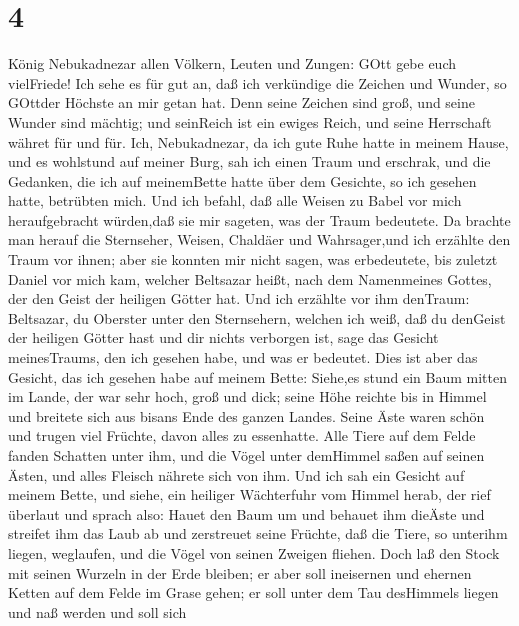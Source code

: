 \hypertarget{section-3}{%
\section{4}\label{section-3}}

 König Nebukadnezar allen Völkern, Leuten und Zungen: GOtt
gebe euch vielFriede!  Ich sehe es für gut an, daß ich
verkündige die Zeichen und Wunder, so GOttder Höchste an mir getan hat.
 Denn seine Zeichen sind groß, und seine Wunder sind
mächtig; und seinReich ist ein ewiges Reich, und seine Herrschaft währet
für und für.  Ich, Nebukadnezar, da ich gute Ruhe hatte in
meinem Hause, und es wohlstund auf meiner Burg,  sah ich
einen Traum und erschrak, und die Gedanken, die ich auf meinemBette
hatte über dem Gesichte, so ich gesehen hatte, betrübten mich.
 Und ich befahl, daß alle Weisen zu Babel vor mich
heraufgebracht würden,daß sie mir sageten, was der Traum bedeutete.
 Da brachte man herauf die Sternseher, Weisen, Chaldäer und
Wahrsager,und ich erzählte den Traum vor ihnen; aber sie konnten mir
nicht sagen, was erbedeutete,  bis zuletzt Daniel vor mich
kam, welcher Beltsazar heißt, nach dem Namenmeines Gottes, der den Geist
der heiligen Götter hat. Und ich erzählte vor ihm denTraum: 
Beltsazar, du Oberster unter den Sternsehern, welchen ich weiß, daß du
denGeist der heiligen Götter hast und dir nichts verborgen ist, sage das
Gesicht meinesTraums, den ich gesehen habe, und was er bedeutet.
 Dies ist aber das Gesicht, das ich gesehen habe auf meinem
Bette: Siehe,es stund ein Baum mitten im Lande, der war sehr hoch,
 groß und dick; seine Höhe reichte bis in Himmel und
breitete sich aus bisans Ende des ganzen Landes.  Seine
Äste waren schön und trugen viel Früchte, davon alles zu essenhatte.
Alle Tiere auf dem Felde fanden Schatten unter ihm, und die Vögel unter
demHimmel saßen auf seinen Ästen, und alles Fleisch nährete sich von
ihm.  Und ich sah ein Gesicht auf meinem Bette, und siehe,
ein heiliger Wächterfuhr vom Himmel herab,  der rief
überlaut und sprach also: Hauet den Baum um und behauet ihm dieÄste und
streifet ihm das Laub ab und zerstreuet seine Früchte, daß die Tiere, so
unterihm liegen, weglaufen, und die Vögel von seinen Zweigen fliehen.
 Doch laß den Stock mit seinen Wurzeln in der Erde bleiben;
er aber soll ineisernen und ehernen Ketten auf dem Felde im Grase gehen;
er soll unter dem Tau desHimmels liegen und naß werden und soll sich
